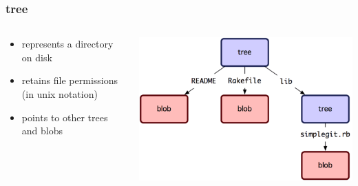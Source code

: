 \begin{frame}[fragile]
	\frametitle{tree}

	\begin{columns}
	\begin{column}{0.5\textwidth}
		\begin{itemize}
		\item represents a directory on disk
		\item retains file permissions (in unix notation)
		\item points to other trees and blobs
		\end{itemize}
	\end{column}
	\begin{column}{0.5\textwidth}
		\includegraphics[width=\textwidth]{images/trees.png}
	\end{column}
	\end{columns}

\end{frame}

